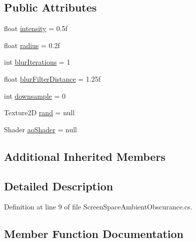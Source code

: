\subsection*{Public Attributes}
\begin{DoxyCompactItemize}
\item 
float \mbox{\hyperlink{class_unity_standard_assets_1_1_image_effects_1_1_screen_space_ambient_obscurance_a5e9ee674b2301b6669202c2c6e69c45b}{intensity}} = 0.\+5f
\item 
float \mbox{\hyperlink{class_unity_standard_assets_1_1_image_effects_1_1_screen_space_ambient_obscurance_abfff72e1edbd23bffd4e9997bd3c6964}{radius}} = 0.\+2f
\item 
int \mbox{\hyperlink{class_unity_standard_assets_1_1_image_effects_1_1_screen_space_ambient_obscurance_ab12303c067beec8d37afe6dbfebb5b0b}{blur\+Iterations}} = 1
\item 
float \mbox{\hyperlink{class_unity_standard_assets_1_1_image_effects_1_1_screen_space_ambient_obscurance_a54dd32393316b4ef8204d3cf8f5a20e8}{blur\+Filter\+Distance}} = 1.\+25f
\item 
int \mbox{\hyperlink{class_unity_standard_assets_1_1_image_effects_1_1_screen_space_ambient_obscurance_a89b8aa1c9fd0ff903ee68b62963a43dd}{downsample}} = 0
\item 
Texture2D \mbox{\hyperlink{class_unity_standard_assets_1_1_image_effects_1_1_screen_space_ambient_obscurance_a2e1a716700f436456ef975308ed03b7a}{rand}} = null
\item 
Shader \mbox{\hyperlink{class_unity_standard_assets_1_1_image_effects_1_1_screen_space_ambient_obscurance_ac8889269f46121ae4c112ebcb1f205aa}{ao\+Shader}} = null
\end{DoxyCompactItemize}
\subsection*{Additional Inherited Members}


\subsection{Detailed Description}


Definition at line 9 of file Screen\+Space\+Ambient\+Obscurance.\+cs.



\subsection{Member Function Documentation}
\mbox{\label{class_unity_standard_assets_1_1_image_effects_1_1_screen_space_ambient_obscurance_aa05dd1fc7e3faf1cee9c5bc09e840434}} 
